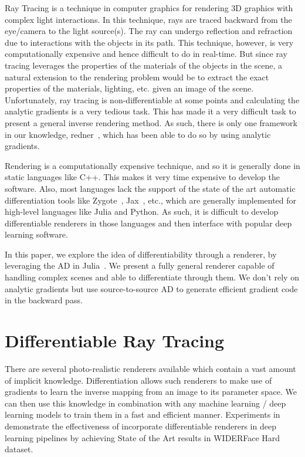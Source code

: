 \documentclass{juliacon}
\begin{document}
Ray Tracing is a technique in computer graphics for rendering 3D graphics with complex light interactions. In this technique, rays are traced backward from the eye/camera to the light source(s). The ray can undergo reflection and refraction due to interactions with the objects in its path. This technique, however, is very computationally expensive and hence difficult to do in real-time. But since ray tracing leverages the properties of the materials of the objects in the scene, a natural extension to the rendering problem would be to extract the exact properties of the materials, lighting, etc. given an image of the scene. Unfortunately, ray tracing is non-differentiable at some points and calculating the analytic gradients is a very tedious task. This has made it a very difficult task to present a general inverse rendering method. As such, there is only one framework in our knowledge, redner~\cite{Li:2018:DMC}, which has been able to do so by using analytic gradients.

Rendering is a computationally expensive technique, and so it is generally done in static languages like C++. This makes it very time expensive to develop the software. Also, most languages lack the support of the state of the art automatic differentiation tools like Zygote~\cite{DBLP:journals/corr/abs-1810-07951}, Jax~\cite{jax}, etc., which are generally implemented for high-level languages like Julia and Python. As such, it is difficult to develop differentiable renderers in those languages and then interface with popular deep learning software.

In this paper, we explore the idea of differentiability through a renderer, by leveraging the AD in Julia~\cite{bezanson2017julia}. We present a fully general renderer capable of handling complex scenes and able to differentiate through them. We don't rely on analytic gradients but use source-to-source AD to generate efficient gradient code in the backward pass.

\section{Differentiable Ray Tracing}

There are several photo-realistic renderers available which contain a vast amount of implicit knowledge. Differentiation allows such renderers to make use of gradients to learn the inverse mapping from an image to its parameter space. We can then use this knowledge in combination with any machine learning / deep learning models to train them in a fast and efficient manner. Experiments in~\cite{retinaface} demonstrate the effectiveness of incorporate differentiable renderers in deep learning pipelines by achieving State of the Art results in WIDERFace Hard dataset.
\end{document}

